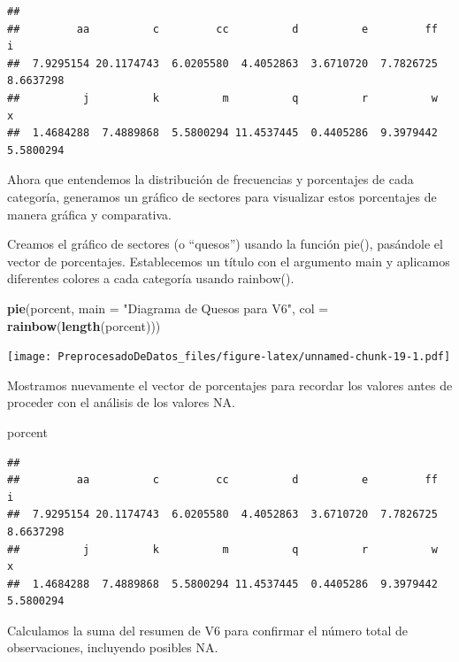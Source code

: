 \documentclass[
]{article}
\newenvironment{Shaded}{\begin{snugshade}}{\end{snugshade}}
\newcommand{\AttributeTok}[1]{\textcolor[rgb]{0.13,0.29,0.53}{#1}}
\newcommand{\FunctionTok}[1]{\textcolor[rgb]{0.13,0.29,0.53}{\textbf{#1}}}
\newcommand{\NormalTok}[1]{#1}
\newcommand{\StringTok}[1]{\textcolor[rgb]{0.31,0.60,0.02}{#1}}
\begin{document}
\begin{verbatim}
## 
##         aa          c         cc          d          e         ff          i 
##  7.9295154 20.1174743  6.0205580  4.4052863  3.6710720  7.7826725  8.6637298 
##          j          k          m          q          r          w          x 
##  1.4684288  7.4889868  5.5800294 11.4537445  0.4405286  9.3979442  5.5800294
\end{verbatim}

Ahora que entendemos la distribución de frecuencias y porcentajes de
cada categoría, generamos un gráfico de sectores para visualizar estos
porcentajes de manera gráfica y comparativa.

Creamos el gráfico de sectores (o ``quesos'') usando la función pie(),
pasándole el vector de porcentajes. Establecemos un título con el
argumento main y aplicamos diferentes colores a cada categoría usando
rainbow().

\begin{Shaded}
\begin{Highlighting}[]
\FunctionTok{pie}\NormalTok{(porcent, }\AttributeTok{main =} \StringTok{"Diagrama de Quesos para V6"}\NormalTok{, }\AttributeTok{col =} \FunctionTok{rainbow}\NormalTok{(}\FunctionTok{length}\NormalTok{(porcent)))}
\end{Highlighting}
\end{Shaded}

\texttt{[image: PreprocesadoDeDatos\_files/figure-latex/unnamed-chunk-19-1.pdf]}

Mostramos nuevamente el vector de porcentajes para recordar los valores
antes de proceder con el análisis de los valores NA.

\begin{Shaded}
\begin{Highlighting}[]
\NormalTok{porcent}
\end{Highlighting}
\end{Shaded}

\begin{verbatim}
## 
##         aa          c         cc          d          e         ff          i 
##  7.9295154 20.1174743  6.0205580  4.4052863  3.6710720  7.7826725  8.6637298 
##          j          k          m          q          r          w          x 
##  1.4684288  7.4889868  5.5800294 11.4537445  0.4405286  9.3979442  5.5800294
\end{verbatim}

Calculamos la suma del resumen de V6 para confirmar el número total de
observaciones, incluyendo posibles NA.
\end{document}
